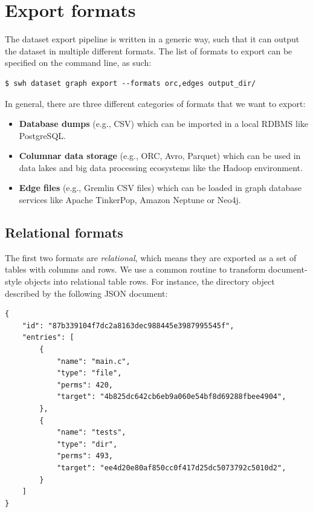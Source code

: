 \section{Export formats}

The dataset export pipeline is written in a generic way, such that it can
output the dataset in multiple different formats. The list of formats to export
can be specified on the command line, as such:

\begin{verbatim}
$ swh dataset graph export --formats orc,edges output_dir/
\end{verbatim}

In general, there are three different categories of formats that we want to
export:

\begin{itemize}
    \item \textbf{Database dumps} (e.g., CSV) which can be imported in a local
        \gls{RDBMS} like PostgreSQL.
    \item \textbf{Columnar data storage} (e.g., ORC, Avro, Parquet) which can
        be used in data lakes and big data processing ecosystems like the
        Hadoop environment.
    \item \textbf{Edge files} (e.g., Gremlin CSV files) which can
        be loaded in graph database services like Apache TinkerPop, Amazon
        Neptune or Neo4j.
\end{itemize}

\subsection{Relational formats}
The first two formats are \emph{relational}, which means they are exported as a
set of tables with columns and rows. We use a common routine to transform
document-style objects into relational table rows. For instance, the directory
object described by the following JSON document:

{\footnotesize
\begin{verbatim}
{
    "id": "87b339104f7dc2a8163dec988445e3987995545f",
    "entries": [
        {
            "name": "main.c",
            "type": "file",
            "perms": 420,
            "target": "4b825dc642cb6eb9a060e54bf8d69288fbee4904",
        },
        {
            "name": "tests",
            "type": "dir",
            "perms": 493,
            "target": "ee4d20e80af850cc0f417d25dc5073792c5010d2",
        }
    ]
}
\end{verbatim}
}

